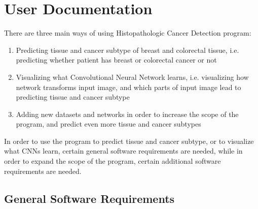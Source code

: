 \chapter{User Documentation} %
\label{ch:user}

There are three main ways of using Histopathologic Cancer Detection program:
\begin{enumerate}
	\itemsep 0em
	\item Predicting tissue and cancer subtype of breast and colorectal tissue, i.e. predicting whether patient has breast or colorectal cancer or not
	\item Visualizing what Convolutional Neural Network learns, i.e. visualizing how network transforms input image, and which parts of input image lead to predicting tissue and cancer subtype
	\item Adding new datasets and networks in order to increase the scope of the program, and predict even more tissue and cancer subtypes
\end{enumerate}
In order to use the program to predict tissue and cancer subtype, or to visualize what CNNs learn, certain general software requirements are needed, while in order to expand the scope of the program, certain additional software requirements are needed.

\section{General Software Requirements}


